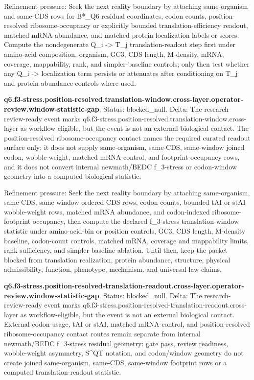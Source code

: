 Refinement pressure: Seek the next reality boundary by attaching same-organism and same-CDS rows for B*\_Q6 residual coordinates, codon counts, position-resolved ribosome-occupancy or explicitly bounded translation-efficiency readout, matched mRNA abundance, and matched protein-localization labels or scores. Compute the nondegenerate Q\_i -> T\_j translation-readout step first under amino-acid composition, organism, GC3, CDS length, M-density, mRNA, coverage, mappability, rank, and simpler-baseline controls; only then test whether any Q\_i -> localization term persists or attenuates after conditioning on T\_j and protein-abundance controls where used.

\textbf{q6.f3-stress.position-resolved.translation-window.cross-layer.operator-review.window-statistic-gap}. Status: blocked\_null. Delta: The research-review-ready event marks q6.f3-stress.position-resolved.translation-window.cross-layer as workflow-eligible, but the event is not an external biological contact. The position-resolved ribosome-occupancy contact names the required curated readout surface only; it does not supply same-organism, same-CDS, same-window joined codon, wobble-weight, matched mRNA-control, and footprint-occupancy rows, and it does not convert internal newmath/BEDC f\_3-stress or codon-window geometry into a computed biological statistic.

Refinement pressure: Seek the next reality boundary by attaching same-organism, same-CDS, same-window ordered-CDS rows, codon counts, bounded tAI or stAI wobble-weight rows, matched mRNA abundance, and codon-indexed ribosome-footprint occupancy, then compute the declared f\_3-stress translation-window statistic under amino-acid-bin or position controls, GC3, CDS length, M-density baseline, codon-count controls, matched mRNA, coverage and mappability limits, rank sufficiency, and simpler-baseline ablation. Until then, keep the packet blocked from translation realization, protein abundance, structure, physical admissibility, function, phenotype, mechanism, and universal-law claims.

\textbf{q6.f3-stress.position-resolved-translation-readout.cross-layer.operator-review.window-statistic-gap}. Status: blocked\_null. Delta: The research-review-ready event marks q6.f3-stress.position-resolved-translation-readout.cross-layer as workflow-eligible, but the event is not an external biological contact. External codon-usage, tAI or stAI, matched mRNA-control, and position-resolved ribosome-occupancy contact routes remain separate from internal newmath/BEDC f\_3-stress residual geometry: gate pass, review readiness, wobble-weight asymmetry, S\textasciicircum{}QT notation, and codon/window geometry do not create joined same-organism, same-CDS, same-window footprint rows or a computed translation-readout statistic.

